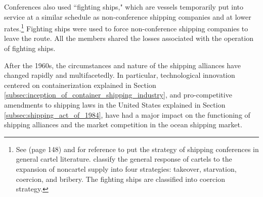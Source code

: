 \documentclass[11pt]{article}
\begin{document}

Conferences also used ``fighting ships," which are vessels temporarily put into service at a similar schedule as non-conference shipping companies and at lower rates.\footnote{See \cite{marshall2014economics} (page 148) and \cite{harrington2018rent} for reference to put the strategy of shipping conferences in general cartel literature. \cite{harrington2018rent} classify the general response of cartels to the expansion of noncartel supply into four strategies: takeover,
starvation, coercion, and bribery. The fighting ships are classified into coercion strategy.} Fighting ships were used to force non-conference shipping companies to leave the route. All the members shared the losses associated with the operation of fighting ships.

After the 1960s, the circumstances and nature of the shipping alliances have changed rapidly and multifacetedly. In particular, technological innovation centered on containerization explained in Section \ref{subsec:inception_of_container_shipping_industry}, and pro-competitive amendments to shipping laws in the United States explained in Section \ref{subsec:shipping_act_of_1984}, have had a major impact on the functioning of shipping alliances and the market competition in the ocean shipping market.



\end{document}

